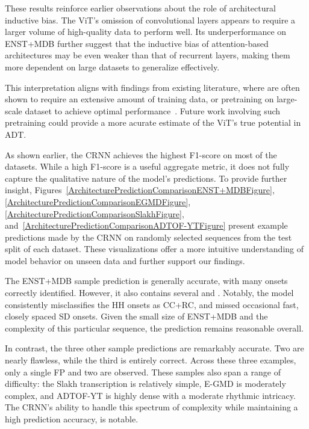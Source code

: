 These results reinforce earlier observations about the role of architectural inductive bias. The \gls{ViT}'s omission of convolutional layers appears to require a larger volume of high-quality data to perform well. Its underperformance on ENST+MDB further suggest that the inductive bias of attention-based architectures may be even weaker than that of recurrent layers, making them more dependent on large datasets to generalize effectively. 

This interpretation aligns with findings from existing literature, where  are often shown to require an extensive amount of training data, or pretraining on large-scale dataset to achieve optimal performance~\cite{dosovitskiy2021imageworth16x16words}. Future work involving such pretraining could provide a more acurate estimate of the \gls{ViT}'s true potential in \gls{ADT}.

As shown earlier, the \acrfull{CRNN} achieves the highest F1-score on most of the datasets. While a high F1-score is a useful aggregate metric, it does not fully capture the qualitative nature of the model's predictions. To provide further insight, Figures~\ref{ArchitecturePredictionComparisonENST+MDBFigure}, \ref{ArchitecturePredictionComparisonEGMDFigure}, \ref{ArchitecturePredictionComparisonSlakhFigure}, and~\ref{ArchitecturePredictionComparisonADTOF-YTFigure} present example predictions made by the \gls{CRNN} on randomly selected sequences from the test split of each dataset. These visualizations offer a more intuitive understanding of model behavior on unseen data and further support our findings.

The ENST+MDB sample prediction is generally accurate, with many onsets correctly identified. However, it also contains several  and . Notably, the model consistently misclassifies the \acrfull{HH} onsets as \acrfull{CC+RC}, and missed occasional fast, closely spaced \acrfull{SD} onsets. Given the small size of ENST+MDB and the complexity of this particular sequence, the prediction remains reasonable overall.

In contrast, the three other sample predictions are remarkably accurate. Two are nearly flawless, while the third is entirely correct. Across these three examples, only a single \acrshort{FP} and two  are observed. These samples also span a range of difficulty: the Slakh transcription is relatively simple, E-GMD is moderately complex, and ADTOF-YT is highly dense with a moderate rhythmic intricacy. The \gls{CRNN}'s ability to handle this spectrum of complexity while maintaining a high prediction accuracy, is notable.

